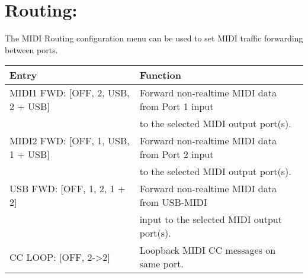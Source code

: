 \section{Routing:}
The MIDI Routing configuration menu can be used to set MIDI traffic forwarding between ports.
\\
\begin{tabular}{|l|l|}
\hline
\rowcolor[HTML]{C0C0C0} 
Entry                                  & Function                                                                       \\ \hline
MIDI1 FWD: {[}OFF, 2, USB, 2 + USB{]}                & Forward non-realtime MIDI data from Port 1 input \\ & to the selected MIDI output port(s).                                                \\ \hline
MIDI2 FWD: {[}OFF, 1, USB, 1 + USB{]}                & Forward non-realtime MIDI data from Port 2 input \\ & to the selected MIDI output port(s).                                               \\ \hline
USB FWD: {[}OFF, 1, 2, 1 + 2{]}          & Forward non-realtime MIDI data from USB-MIDI \\ & input to the selected MIDI output port(s).                                            \\ \hline
CC LOOP: {[}OFF, 2->2{]}          & Loopback MIDI CC messages on same port.                                      \\ \hline
\end{tabular}


\newpage
